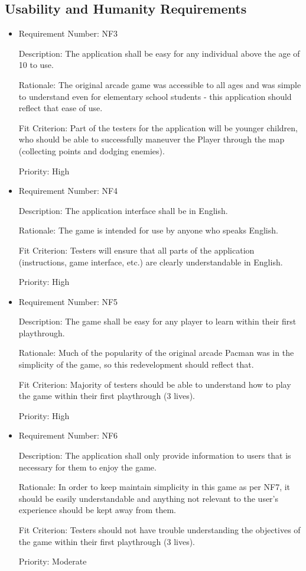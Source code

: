 \documentclass[12pt, titlepage]{article}
\begin{document}
\subsection{Usability and Humanity Requirements}
\begin{itemize}
	\item
	Requirement Number: NF3

	Description: The application shall be easy for any individual above the age of 10 to use.

	Rationale: The original arcade game was accessible to all ages and was simple to understand even for elementary school students - this application should reflect that ease of use.

	Fit Criterion: Part of the testers for the application will be younger children, who should be able to successfully maneuver the Player through the map (collecting points and dodging enemies).

	Priority: High

	\item
	Requirement Number: NF4

	Description: The application interface shall be in English.

	Rationale: The game is intended for use by anyone who speaks English.

	Fit Criterion: Testers will ensure that all parts of the application (instructions, game interface, etc.) are clearly understandable in English.

	Priority: High

	\item
	Requirement Number: NF5

	Description: The game shall be easy for any player to learn within their first playthrough.

	Rationale: Much of the popularity of the original arcade Pacman was in the simplicity of the game, so this redevelopment should reflect that.

	Fit Criterion: Majority of testers should be able to understand how to play the game within their first playthrough (3 lives).

	Priority: High

	\item
	Requirement Number: NF6

	Description: The application shall only provide information to users that is necessary for them to enjoy the game.

	Rationale: In order to keep maintain simplicity in this game as per NF7, it should be easily understandable and anything not relevant to the user's experience should be kept away from them.

	Fit Criterion: Testers should not have trouble understanding the objectives of the game within their first playthrough (3 lives).

	Priority: Moderate
\end{itemize}
\end{document}
